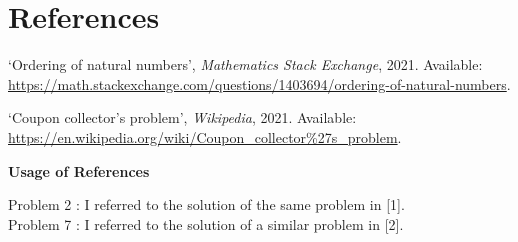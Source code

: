 \documentclass[10pt]{article}
\begin{document}
\section*{References}
\begin{enumerate}[leftmargin=*, label={[\arabic*]}]
    \item `Ordering of natural numbers', \textit{Mathematics Stack Exchange}, 2021. Available: \url{https://math.stackexchange.com/questions/1403694/ordering-of-natural-numbers}.
    \item `Coupon collector's problem', \textit{Wikipedia}, 2021. Available: \url{https://en.wikipedia.org/wiki/Coupon_collector%27s_problem}.
\end{enumerate}

\vspace{0.3cm}
\textbf{Usage of References}

\vspace{0.2cm}
Problem 2 : I referred to the solution of the same problem in [1]. \\
Problem 7 : I referred to the solution of a similar problem in [2].
\end{document}
